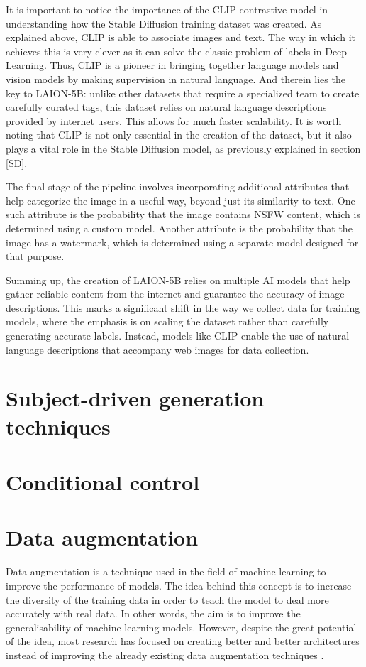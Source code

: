 It is important to notice the importance of the CLIP contrastive model in understanding how the Stable Diffusion training dataset was created. As explained above, CLIP is able to associate images and text. The way in which it achieves this is very clever as it can solve the classic problem of labels in Deep Learning. Thus, CLIP is a pioneer in bringing together language models and vision models by making supervision in natural language. And therein lies the key to LAION-5B: unlike other datasets that require a specialized team to create carefully curated tags, this dataset relies on natural language descriptions provided by internet users. This allows for much faster scalability. It is worth noting that CLIP is not only essential in the creation of the dataset, but it also plays a vital role in the Stable Diffusion model, as previously explained in section \ref{SD}.

The final stage of the pipeline involves incorporating additional attributes that help categorize the image in a useful way, beyond just its similarity to text. One such attribute is the probability that the image contains NSFW content, which is determined using a custom model. Another attribute is the probability that the image has a watermark, which is determined using a separate model designed for that purpose.

Summing up, the creation of LAION-5B relies on multiple AI models that help gather reliable content from the internet and guarantee the accuracy of image descriptions. This marks a significant shift in the way we collect data for training models, where the emphasis is on scaling the dataset rather than carefully generating accurate labels. Instead, models like CLIP enable the use of natural language descriptions that accompany web images for data collection.

\section{Subject-driven generation techniques}

\section{Conditional control}

\section{Data augmentation}

Data augmentation is a technique used in the field of machine learning to improve the performance of models. The idea behind this concept is to increase the diversity of the training data in order to teach the model to deal more accurately with real data. In other words, the aim is to improve the generalisability of machine learning models. However, despite the great potential of the idea, most research has focused on creating better and better architectures instead of improving the already existing data augmentation techniques \cite{cubuk2018autoaugment}.

